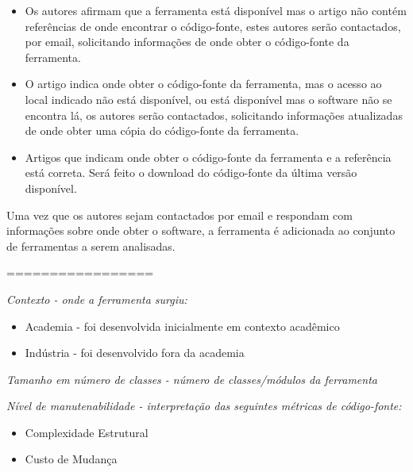 \begin{itemize}

  \item Os autores afirmam que a ferramenta está disponível mas o artigo
    não contém referências de onde encontrar o código-fonte, estes
    autores serão contactados, por email, solicitando informações de onde
    obter o código-fonte da ferramenta.

  \item O artigo indica onde obter o código-fonte da ferramenta, mas o acesso ao local
    indicado não está disponível, ou está disponível mas o software não se
    encontra lá, os autores serão contactados, solicitando informações
    atualizadas de onde obter uma cópia do código-fonte da ferramenta.

  \item Artigos que indicam onde obter o código-fonte da ferramenta e a referência
    está correta. Será feito o download do código-fonte da última versão
    disponível.

\end{itemize}

Uma vez que os autores sejam contactados por email e respondam com informações
sobre onde obter o software, a ferramenta é adicionada ao conjunto de
ferramentas a serem analisadas.

=================


\begin{description}

  \item {\it Contexto - onde a ferramenta surgiu:}
    \begin{itemize}
      \item Academia - foi desenvolvida inicialmente em contexto acadêmico
      \item Indústria - foi desenvolvido fora da academia
    \end{itemize}

  \item {\it Tamanho em número de classes - número de classes/módulos da ferramenta}

  \item {\it Nível de manutenabilidade - interpretação das seguintes métricas de código-fonte:}
    \begin{itemize}
      \item Complexidade Estrutural
      \item Custo de Mudança
    \end{itemize}

\end{description}



